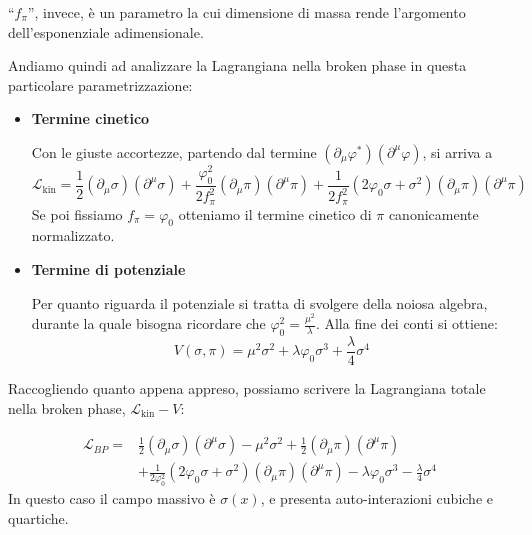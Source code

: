 \documentclass[../main.tex]{subfiles}
\begin{document}
“$f_\pi$”, invece, è un parametro la cui dimensione di massa rende l'argomento dell'esponenziale adimensionale.

Andiamo quindi ad analizzare la Lagrangiana nella broken phase in questa particolare parametrizzazione: 
\begin{itemize}
    \item[\blacklozenge] \textbf{Termine cinetico}

    Con le giuste accortezze, partendo dal termine $(\partial_\mu\varphi^\ast)(\partial^\mu\varphi)$, si arriva a 
    \begin{equation}
        \mathscr{L}_\text{kin} = \frac{1}{2}(\partial_\mu\sigma)(\partial^\mu\sigma) +\frac{\varphi_0^2}{2f_\pi^2}(\partial_\mu\pi)(\partial^\mu\pi) + \frac{1}{2f_\pi^2}(2\varphi_0\sigma + \sigma^2)(\partial_\mu\pi)(\partial^\mu\pi)
        \label{eq:kinetic_lagrangian_nonlinear}
    \end{equation}
    Se poi fissiamo $\boxed{f_\pi = \varphi_0}$ otteniamo il termine cinetico di $\pi$ canonicamente normalizzato.
    
    \item[\blacklozenge] \textbf{Termine di potenziale}
    
    Per quanto riguarda il potenziale si tratta di svolgere della noiosa algebra, durante la quale bisogna ricordare che $\varphi_0^2 = \frac{\mu^2}{\lambda}$. Alla fine dei conti si ottiene:
    \begin{equation}
        V(\sigma, \pi) = \mu^2\sigma^2 + \lambda\varphi_0\sigma^3 + \frac{\lambda}{4}\sigma^4
        \label{eq:potential_nonlinear}
    \end{equation}
\end{itemize}
Raccogliendo quanto appena appreso, possiamo scrivere la Lagrangiana totale nella broken phase, $\mathscr{L}_\text{kin} - V$:

\begin{equation}
    \boxed{\begin{aligned}
        \mathscr{L}_{BP} =& \frac{1}{2}(\partial_\mu\sigma)(\partial^\mu\sigma) - \mu^2\sigma^2 +\frac{1}{2}(\partial_\mu\pi)(\partial^\mu\pi) \\
        &+ \frac{1}{2\varphi_0^2}(2\varphi_0\sigma + \sigma^2)(\partial_\mu\pi)(\partial^\mu\pi) - \lambda\varphi_0\sigma^3 - \frac{\lambda}{4}\sigma^4
    \end{aligned}}
    \label{eq:broken_phase_lagrangian_nonlinear}
\end{equation}
In questo caso il campo massivo è $\sigma(x)$, e presenta auto-interazioni cubiche e quartiche. 
\end{document}
